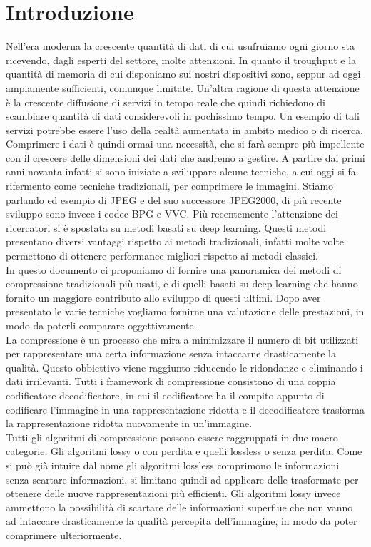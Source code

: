 \chapter*{Introduzione}
Nell’era moderna la crescente quantità di dati di cui usufruiamo ogni giorno sta ricevendo, dagli esperti del settore, molte attenzioni. In quanto il troughput e la quantità di memoria di cui disponiamo sui nostri dispositivi sono, seppur ad oggi ampiamente sufficienti, comunque limitate. Un’altra ragione di questa attenzione è la crescente diffusione di servizi in tempo reale che quindi richiedono di scambiare quantità di dati considerevoli in pochissimo tempo. Un esempio di tali servizi potrebbe essere l’uso della realtà aumentata in ambito medico o di ricerca. Comprimere i dati è quindi ormai una necessità, che si farà sempre più impellente con il crescere delle dimensioni dei dati che andremo a gestire.
A partire dai primi anni novanta infatti si sono iniziate a sviluppare alcune tecniche, a cui oggi si fa rifermento come tecniche tradizionali, per comprimere le immagini. Stiamo parlando ed esempio di JPEG e del suo successore JPEG2000, di più recente sviluppo sono invece i codec BPG e VVC.
Più recentemente l’attenzione dei ricercatori si è spostata su metodi basati su deep learning. Questi metodi presentano diversi vantaggi rispetto ai metodi tradizionali, infatti molte volte permettono di ottenere performance migliori rispetto ai metodi classici.\\
In questo documento ci proponiamo di fornire una panoramica dei metodi di compressione tradizionali più usati, e di quelli basati su deep learning che hanno fornito un maggiore contributo allo sviluppo di questi ultimi. Dopo aver presentato le varie tecniche vogliamo fornirne una valutazione delle prestazioni, in modo da poterli comparare oggettivamente.\\
La compressione è un processo che mira a minimizzare il numero di bit utilizzati per rappresentare una certa informazione senza intaccarne drasticamente la qualità. Questo obbiettivo viene raggiunto riducendo le ridondanze e eliminando i dati irrilevanti.
Tutti i framework di compressione consistono di una coppia codificatore-decodificatore, in cui il codificatore ha il compito appunto di codificare l’immagine in una rappresentazione ridotta e il decodificatore trasforma la rappresentazione ridotta nuovamente in un’immagine.\\
Tutti gli algoritmi di compressione possono essere raggruppati in due macro categorie. Gli algoritmi lossy o con perdita e quelli lossless o senza perdita. Come si può già intuire dal nome gli algoritmi lossless comprimono le informazioni senza scartare informazioni, si limitano quindi ad applicare delle trasformate per ottenere delle nuove rappresentazioni più efficienti. Gli algoritmi lossy invece ammettono la possibilità di scartare delle informazioni superflue che non vanno ad intaccare drasticamente la qualità percepita dell’immagine, in modo da poter comprimere ulteriormente.
